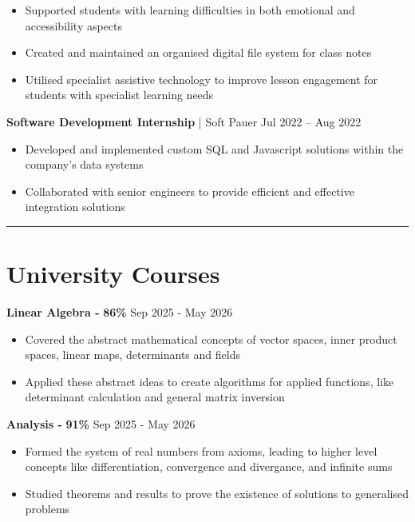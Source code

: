 \documentclass[11pt, a4paper]{article}
\newcommand{\cvline}{\vspace{-4pt}\noindent\rule{\linewidth}{0.5pt}\vspace{-8pt}}
\begin{document}
\begin{itemize}[leftmargin=*, itemsep=-3pt, topsep=2pt]
\item Supported students with learning difficulties in both emotional and accessibility aspects 
\item Created and maintained an organised digital file system for class notes
\item Utilised specialist assistive technology to improve lesson engagement for students with specialist learning needs
\end{itemize}

\vspace{2pt}
{\large\textbf{Software Development Internship} | Soft Pauer \hfill	Jul 2022 – Aug 2022}
\vspace{2pt}

\begin{itemize}[leftmargin=*, itemsep=-3pt, topsep=2pt]
\item Developed and implemented custom SQL and Javascript solutions within the company's data systems
\item Collaborated with senior engineers to provide efficient and effective integration solutions
\end{itemize}


\cvline
\section{University Courses}

\vspace{2pt}
{\large\textbf{Linear Algebra -} \textbf{86\%} \hfill Sep 2025 - May 2026}
\vspace{2pt}

\begin{itemize}[leftmargin=*, itemsep=-3pt, topsep=2pt]
	\item Covered the abstract mathematical concepts of vector spaces, 
		inner product spaces, linear maps, determinants and fields
	\item Applied these abstract ideas to create algorithms for applied 
		functions, like determinant calculation and general matrix inversion
\end{itemize}


\vspace{2pt}
{\large\textbf{Analysis -} \textbf{91\%} \hfill Sep 2025 - May 2026}
\vspace{2pt}

\begin{itemize}[leftmargin=*, itemsep=-3pt, topsep=2pt]
	\item Formed the system of real numbers from axioms, leading to higher level concepts
		like differentiation, convergence and divergance, and infinite sums
	\item Studied theorems and results to prove the existence of solutions to generalised 
		problems
\end{itemize}
\end{document}
